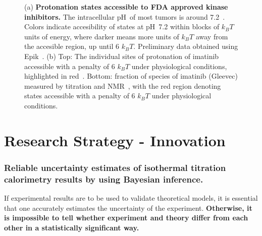 \documentclass[10pt,final]{article}
\newif\ifinstr
\newcommand{\instr}[1]{\ifdraft{\ifinstr {\color{cyan}\emph{#1}} \fi}{}}
\newcommand{\pH}{p$\mathrm{H}$\ }
\begin{document}
\begin{figure}[H]
\begin{subfigure}{.48\textwidth}
  \caption{}
  \label{figure:imatinib-pKa}
\end{subfigure}
\caption{(a) \textbf{Protonation states accessible to FDA approved kinase inhibitors.} 
The intracellular \pH of most tumors is around 7.2~\autocite{Griffiths1991a,Stubbs2000a}.
Colors indicate accesibility of states at \pH 7.2 within blocks of $k_BT$ units of energy, where darker means more units of $k_BT$ away from the accesible region, up until 6 $k_BT$.
Preliminary data obtained using Epik~\autocite{Shelley2007a,Greenwood2010a}.
(b) Top: The individual sites of protonation of imatinib accessible with a penalty of 6 $k_BT$ under physiological conditions, highlighted in red~\autocite{Szakacs2005a}. Bottom: fraction of species of imatinib (Gleevec) measured by titration and NMR~\autocite{Szakacs2005a}, with the red region denoting states accessible with a penalty of 6 $k_BT$ under physiological conditions.}
\label{figure:kinase-pKa}
\end{figure}







\section*{Research Strategy - Innovation}
\instr{Explain how your proposal differs from what others have tried.}
\subsubsection*{Reliable uncertainty estimates of isothermal titration calorimetry results by using Bayesian inference.}
If experimental results are to be used to validate theoretical models, it is essential that one accurately estimates the uncertainty of the experiment. 
%
\textbf{Otherwise, it is impossible to tell whether experiment and theory differ from each other in a statistically significant way.}
\end{document}
